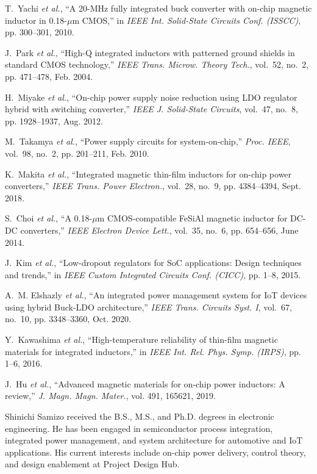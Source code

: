 \documentclass[journal]{IEEEtran}
\begin{document}
\begin{thebibliography}{10}
T.~Yachi \emph{et al.}, ``A 20-MHz fully integrated buck converter with on-chip magnetic inductor in 0.18-$\mu$m CMOS,'' in \emph{IEEE Int. Solid-State Circuits Conf. (ISSCC)}, pp. 300--301, 2010.

J.~Park \emph{et al.}, ``High-Q integrated inductors with patterned ground shields in standard CMOS technology,'' \emph{IEEE Trans. Microw. Theory Tech.}, vol.~52, no.~2, pp. 471--478, Feb. 2004.

H.~Miyake \emph{et al.}, ``On-chip power supply noise reduction using LDO regulator hybrid with switching converter,'' \emph{IEEE J. Solid-State Circuits}, vol.~47, no.~8, pp. 1928--1937, Aug. 2012.

M.~Takamya \emph{et al.}, ``Power supply circuits for system-on-chip,'' \emph{Proc. IEEE}, vol.~98, no.~2, pp. 201--211, Feb. 2010.

K.~Makita \emph{et al.}, ``Integrated magnetic thin-film inductors for on-chip power converters,'' \emph{IEEE Trans. Power Electron.}, vol.~28, no.~9, pp. 4384--4394, Sept. 2018.

S.~Choi \emph{et al.}, ``A 0.18-$\mu$m CMOS-compatible FeSiAl magnetic inductor for DC-DC converters,'' \emph{IEEE Electron Device Lett.}, vol.~35, no.~6, pp. 654--656, June 2014.

J.~Kim \emph{et al.}, ``Low-dropout regulators for SoC applications: Design techniques and trends,'' in \emph{IEEE Custom Integrated Circuits Conf. (CICC)}, pp. 1--8, 2015.

A.~M. Elshazly \emph{et al.}, ``An integrated power management system for IoT devices using hybrid Buck-LDO architecture,'' \emph{IEEE Trans. Circuits Syst. I}, vol.~67, no.~10, pp. 3348--3360, Oct. 2020.

Y.~Kawashima \emph{et al.}, ``High-temperature reliability of thin-film magnetic materials for integrated inductors,'' in \emph{IEEE Int. Rel. Phys. Symp. (IRPS)}, pp. 1--6, 2016.

J.~Hu \emph{et al.}, ``Advanced magnetic materials for on-chip power inductors: A review,'' \emph{J. Magn. Magn. Mater.}, vol. 491, 165621, 2019.
\end{thebibliography}


\begin{IEEEbiography}{Shinichi Samizo}
received the B.S., M.S., and Ph.D. degrees in electronic engineering. He has been engaged in semiconductor process integration, integrated power management, and system architecture for automotive and IoT applications. His current interests include on-chip power delivery, control theory, and design enablement at Project Design Hub.
\end{IEEEbiography}
\end{document}
